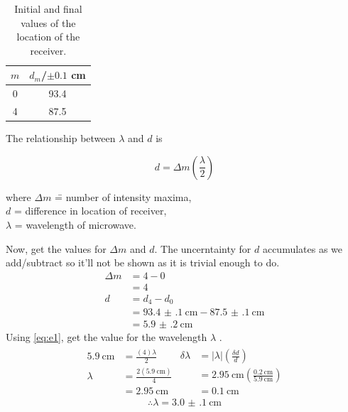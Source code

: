 \documentclass[letter,12pt]{article}
\newcommand{\tlambda}{\(\lambda\) }
\numberwithin{equation}{section}
\numberwithin{figure}{section}
\numberwithin{table}{section}
\begin{document}
\begin{table}[!ht]
  \centering
  \begin{tabular}{cS}
    \toprule
    {\(m\)} & {\(d_m\)/\(\pm 0.1\) \si{\cm}} \\  & 93.4 \\
    4 & 87.5 \\
    \bottomrule
  \end{tabular}
  \caption{Initial and final values of the location of the receiver.}
  \label{table:e1}
\end{table}

The relationship between \tlambda and \(d\) is

\begin{equation} \label{eq:e1}
  d = \Delta m \left( \frac{\lambda}{2} \right)
\end{equation} 
\nopagebreak[4]
\begin{tabbing}
  where \= \(\Delta m\) \= = number of intensity maxima, \\
  \> \(d\) \> = difference in location of receiver, \\
  \> \tlambda \> = wavelength of microwave.
\end{tabbing}

Now, get the values for \(\Delta m\) and \(d\). The uncerntainty for \(d\) accumulates as we add/subtract so it'll not be shown as it is trivial enough to do.
\begin{align*}
  \Delta m &= 4 - 0 \\
  &= 4 \\
  d &= d_4 - d_0 \\
  &= \SI{93.4(1)}{\cm} - \SI{87.5(1)}{\cm} \\
  &= \SI{5.9(2)}{\cm}
\end{align*}
Using \eqref{eq:e1}, get the value for the wavelength \tlambda.
\begin{align*}
  \begin{split}
    \SI{5.9}{\cm} &= \frac{(4) \lambda}{2} \\
    \lambda &= \frac{2(\SI{5.9}{\cm})}{4} \\
    &= \SI{2.95}{\cm}
  \end{split}
  \begin{split}
    \delta \lambda &= |\lambda|\left( \frac{\delta d}{d} \right) \\
    &= \SI{2.95}{\cm} \left( \frac{\SI{0.2}{\cm}}{\SI{5.9}{\cm}} \right) \\
    &= \SI{0.1}{\cm}
  \end{split}
\end{align*}
\[\therefore \lambda = \SI{3.0(1)}{\cm}\]
\end{document}
